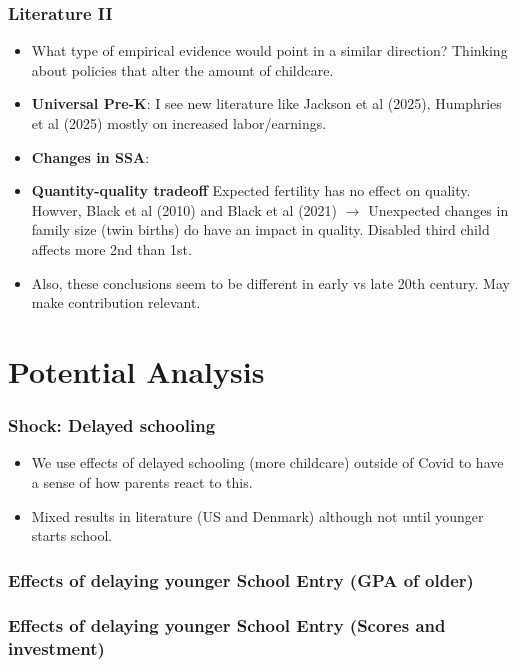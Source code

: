 \documentclass{beamer}
\begin{document}
\begin{frame}
    \label{update_scott}
    \frametitle{Literature II}
      \begin{itemize}
        \item  What type of empirical evidence would point in a similar direction? Thinking about policies that alter the amount of childcare.
        \item \textbf{Universal Pre-K}: I see new literature like Jackson et al (2025), Humphries et al (2025) mostly on increased labor/earnings.
        \item \textbf{Changes in SSA}:
        \item \textbf{Quantity-quality tradeoff} Expected fertility has no effect on quality. Howver, Black et al (2010) and Black et al (2021) $\rightarrow$ Unexpected changes in family size (twin births) do have an impact in quality. Disabled third child affects more 2nd than 1st.
        \item Also, these conclusions seem to be different in early vs late 20th century. May make contribution relevant.
    \end{itemize}
\end{frame}








\section{Potential Analysis}

\begin{frame}
    \label{update_scott}
    \frametitle{Shock: Delayed schooling}
        \begin{itemize}
            \item We use effects of delayed schooling (more childcare) outside of Covid to have a sense of how parents react to this.
            \item Mixed results in literature (US and Denmark) although not until younger starts school.
        \end{itemize}
\end{frame}



\begin{frame}
    \frametitle{Effects of delaying younger School Entry (GPA of older)}
    
\end{frame}

\begin{frame}
    \frametitle{Effects of delaying younger School Entry (Scores and investment)}
    
\end{frame}
\end{document}
